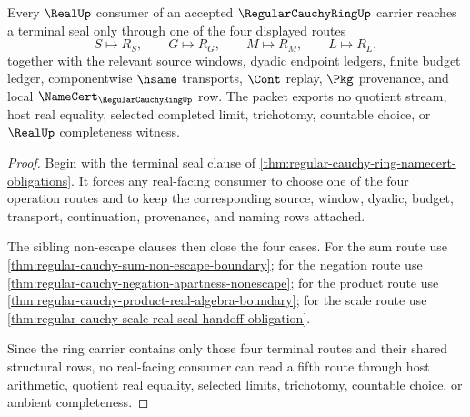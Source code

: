 \begin{theorem}
\label{thm:regular-cauchy-ring-real-seal-nonescape}
Every $\RealUp$ consumer of an accepted $\RegularCauchyRingUp$ carrier reaches a terminal seal only through one of the four displayed routes
$$
S\longmapsto R_S,\qquad G\longmapsto R_G,\qquad M\longmapsto R_M,\qquad L\longmapsto R_L,
$$
together with the relevant source windows, dyadic endpoint ledgers, finite budget ledger, componentwise $\hsame$ transports, $\Cont$ replay, $\Pkg$ provenance, and local $\NameCert_{\RegularCauchyRingUp}$ row. The packet exports no quotient stream, host real equality, selected completed limit, trichotomy, countable choice, or $\RealUp$ completeness witness.
\end{theorem}
\begin{proof}
Begin with the terminal seal clause of \autoref{thm:regular-cauchy-ring-namecert-obligations}. It forces any real-facing consumer to choose one of the four operation routes and to keep the corresponding source, window, dyadic, budget, transport, continuation, provenance, and naming rows attached.

The sibling non-escape clauses then close the four cases. For the sum route use \autoref{thm:regular-cauchy-sum-non-escape-boundary}; for the negation route use \autoref{thm:regular-cauchy-negation-apartness-nonescape}; for the product route use \autoref{thm:regular-cauchy-product-real-algebra-boundary}; for the scale route use \autoref{thm:regular-cauchy-scale-real-seal-handoff-obligation}.

Since the ring carrier contains only those four terminal routes and their shared structural rows, no real-facing consumer can read a fifth route through host arithmetic, quotient real equality, selected limits, trichotomy, countable choice, or ambient completeness.
\end{proof}


